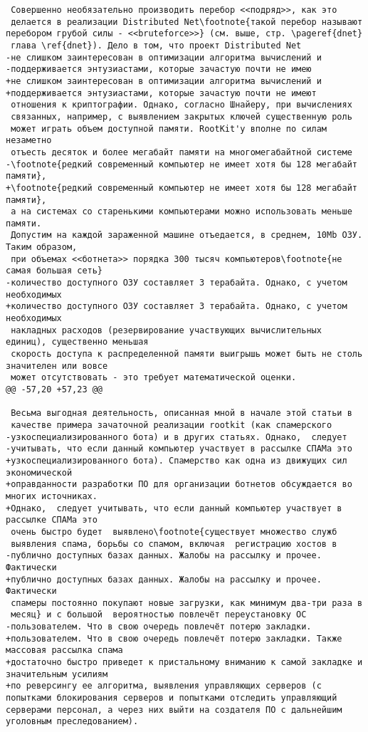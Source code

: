 \begin{verbatim}
 Совершенно необязательно производить перебор <<подряд>>, как это
 делается в реализации Distributed Net\footnote{такой перебор называют перебором грубой силы - <<bruteforce>>} (см. выше, стр. \pageref{dnet}
 глава \ref{dnet}). Дело в том, что проект Distributed Net
-не слишком заинтересован в оптимизации алгоритма вычислений и
-поддерживается энтузиастами, которые зачастую почти не имею
+не слишком заинтересован в оптимизации алгоритма вычислений и
+поддерживается энтузиастами, которые зачастую почти не имеют
 отношения к криптографии. Однако, согласно Шнайеру, при вычислениях
 связанных, например, с выявлением закрытых ключей существенную роль
 может играть объем доступной памяти. RootKit'у вполне по силам незаметно
 отъесть десяток и более мегабайт памяти на многомегабайтной системе
-\footnote{редкий современный компьютер не имеет хотя бы 128 мегабайт памяти},
+\footnote{редкий современный компьютер не имеет хотя бы 128 мегабайт памяти},
 а на системах со старенькими компьютерами можно использовать меньше памяти.
 Допустим на каждой зараженной машине отъедается, в среднем, 10Mb ОЗУ. Таким образом,
 при объемах <<ботнета>> порядка 300 тысяч компьютеров\footnote{не самая большая сеть}
-количество доступного ОЗУ составляет 3 терабайта. Однако, с учетом необходимых
+количество доступного ОЗУ составляет 3 терабайта. Однако, с учетом необходимых
 накладных расходов (резервирование участвующих вычислительных единиц), существенно меньшая
 скорость доступа к распределенной памяти выигрышь может быть не столь значителен или вовсе
 может отсутствовать - это требует математической оценки.
@@ -57,20 +57,23 @@

 Весьма выгодная деятельность, описанная мной в начале этой статьи в
 качестве примера зачаточной реализации rootkit (как спамерского
-узкоспециализированного бота) и в других статьях. Однако,  следует
-учитывать, что если данный компьютер участвует в рассылке СПАМа это
+узкоспециализированного бота). Спамерство как одна из движущих сил экономической
+оправданности разработки ПО для организации ботнетов обсуждается во многих источниках.
+Однако,  следует учитывать, что если данный компьютер участвует в рассылке СПАМа это
 очень быстро будет  выявлено\footnote{существует множество служб
 выявления спама, борьбы со спамом, включая  регистрацию хостов в
-публично доступных базах данных. Жалобы на рассылку и прочее. Фактически
+публично доступных базах данных. Жалобы на рассылку и прочее. Фактически
 спамеры постоянно покупают новые загрузки, как минимум два-три раза в
 месяц} и с большой  вероятностью повлечёт переустановку ОС
-пользователем. Что в свою очередь повлечёт потерю закладки.
+пользователем. Что в свою очередь повлечёт потерю закладки. Также массовая рассылка спама
+достаточно быстро приведет к пристальному вниманию к самой закладке и значительным усилиям
+по реверсингу ее алгоритма, выявления управляющих серверов (с попытками блокирования серверов и попытками отследить управляющий серверами персонал, а через них выйти на создателя ПО с дальнейшим уголовным преследованием).


\end{verbatim}
